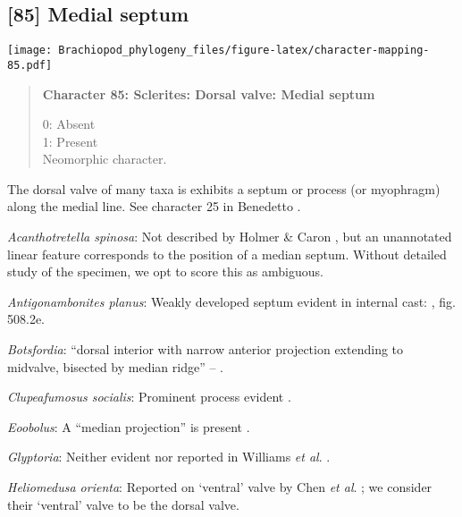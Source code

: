 \documentclass[openany]{book}
\theoremstyle{definition}
\theoremstyle{definition}
\theoremstyle{definition}
\theoremstyle{remark}
\begin{document}
\subsection*{{[}85{]} Medial septum}\label{medial-septum}

\texttt{[image: Brachiopod\_phylogeny\_files/figure-latex/character-mapping-85.pdf]}

\begin{quote}
\textbf{Character 85: Sclerites: Dorsal valve: Medial septum}

0: Absent\\
1: Present\\
Neomorphic character.
\end{quote}

The dorsal valve of many taxa is exhibits a septum or process (or
myophragm) along the medial line. See character 25 in Benedetto
\citeyearpar{Benedetto2009iChaniella}.

\hypertarget{Acanthotretella_spinosa-coding-85}{}
\emph{Acanthotretella spinosa}: Not described by Holmer \& Caron
\citeyearpar{Holmer2006Aspinose}, but an unannotated linear feature
corresponds to the position of a median septum. Without detailed study
of the specimen, we opt to score this as ambiguous.

\hypertarget{Antigonambonites_planus-coding-85}{}
\emph{Antigonambonites planus}: Weakly developed septum evident in
internal cast: \citet{Williams2000LinguliformeaCraniiformea}, fig.
508.2e.

\hypertarget{Botsfordia-coding-85}{}
\emph{Botsfordia}: ``dorsal interior with narrow anterior projection
extending to midvalve, bisected by median ridge'' --
\citet{Williams2000LinguliformeaCraniiformea}.

\hypertarget{Clupeafumosus_socialis-coding-85}{}
\emph{Clupeafumosus socialis}: Prominent process evident
\citep{Topper2013Reappraisalof}.

\hypertarget{Eoobolus-coding-85}{}
\emph{Eoobolus}: A ``median projection'' is present \citep[fig. 4g
in][]{Balthasar2009Thebrachiopod}.

\hypertarget{Glyptoria-coding-85}{}
\emph{Glyptoria}: Neither evident nor reported in Williams \emph{et al}.
\citeyearpar{Williams2000LinguliformeaCraniiformea}.

\hypertarget{Heliomedusa_orienta-coding-85}{}
\emph{Heliomedusa orienta}: Reported on `ventral' valve by Chen \emph{et
al}. \citeyearpar{Chen2007Reinterpretationof}; we consider their
`ventral' valve to be the dorsal valve.
\end{document}
